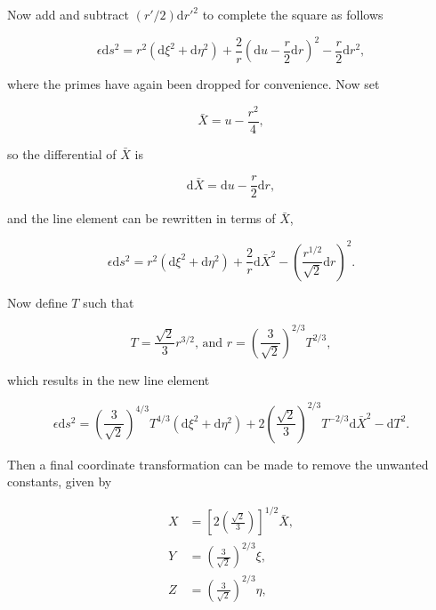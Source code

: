 \noindent Now add and subtract $(r'/2) \mathrm{d} {r'}^2$ to complete the square as follows

\begin{equation*}  
\epsilon \mathrm{d} s^2 = r^2 (\mathrm{d} \xi^2 + \mathrm{d} \eta^2) + \frac{2}{r}{\left( \mathrm{d} u  - \frac{r}{2} \mathrm{d} r\right)}^2 - \frac{r}{2}\mathrm{d} r^2,
\end{equation*}

\noindent where the primes have again been dropped for convenience. Now set

\begin{equation*}
\bar{X} = u - \frac{r^2}{4},
\end{equation*}

\noindent so the differential of $\bar{X}$ is

\begin{equation*}
\mathrm{d} \bar{X} = \mathrm{d} u - \frac{r}{2} \mathrm{d}r,
\end{equation*}

\noindent and the line element can be rewritten in terms of $\bar{X}$,

\begin{equation*}
\epsilon \mathrm{d} s^2 = r^2 (\mathrm{d} \xi^2 + \mathrm{d} \eta^2) + \frac{2}{r} \mathrm{d} \bar{X}^2 - {\left( \frac{r^{1/2}}{\sqrt{2}} \mathrm{d} r\right)}^{2}.
\end{equation*}

\noindent Now define $T$ such that

\begin{equation*}
T = \frac{\sqrt{2}}{3} r^{3/2} \text{,       and    } r = {\left( \frac{3}{\sqrt{2}} \right)}^{2/3} T^{2/3},
\end{equation*}

\noindent which results in the new line element

\begin{equation*}
\epsilon \mathrm{d} s^2 = \left( \frac{3}{\sqrt{2}} \right)^{4/3} T^{4/3} (\mathrm{d} \xi^2 + \mathrm{d} \eta^2) + 2 \left( \frac{\sqrt{2}}{3}\right)^{2/3} T^{-2/3} \mathrm{d} \bar{X}^2 - \mathrm{d} T^2.
\end{equation*}

\noindent Then a final coordinate transformation can be made to remove the unwanted constants, given by

\begin{align*} 
X & = \left[ 2\left( \frac{\sqrt{2}}{3}\right)\right]^{1/2} \bar{X}, \\
Y & = \left( \frac{3}{\sqrt{2}} \right)^{2/3} \xi, \\
Z & = \left( \frac{3}{\sqrt{2}} \right)^{2/3} \eta, \\
\end{align*} 

